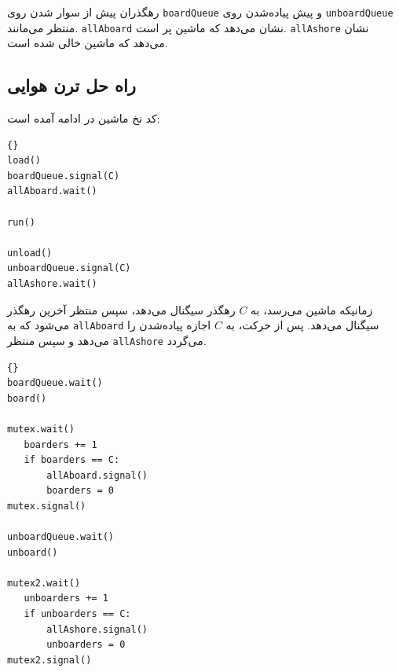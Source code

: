 \documentclass{book}
\newcommand{\clearemptydoublepage}{\newpage\cleardoublepage}
\begin{document}
    رهگذران پیش از سوار شدن  روی {\tt boardQueue}   و پیش پیاده‌شدن روی {\tt unboardQueue} منتظر می‌مانند.   {\tt allAboard}
    نشان می‌دهد که ماشین پر است. {\tt allAshore} نشان می‌دهد که ماشین خالی شده است. 


\clearemptydoublepage
\subsection{راه حل ترن هوایی}

    کد نخ ماشین در ادامه آمده است: 

\begin{latin}
\begin{lstlisting}[title=\rl{راه حل ترن هوایی (ماشین)}]{} 
load()
boardQueue.signal(C)
allAboard.wait()

run()

unload()
unboardQueue.signal(C)
allAshore.wait()
\end{lstlisting}
\end{latin}

    زمانیکه ماشین می‌رسد، به $C$  رهگذر سیگنال می‌دهد، سپس منتظر آخرین رهگذر می‌شود که به {\tt allAboard} سیگنال می‌دهد. 
    پس از حرکت، به $C$ اجازه پیاده‌شدن را می‌دهد و سپس منتظر {\tt allAshore} می‌گردد. 
\begin{latin}
\begin{lstlisting}[title=\rl{راه حل ترن هوایی (رهگذر)}]{} 
boardQueue.wait()
board()

mutex.wait()
   boarders += 1
   if boarders == C:
       allAboard.signal()
       boarders = 0
mutex.signal()

unboardQueue.wait()
unboard()

mutex2.wait()
   unboarders += 1
   if unboarders == C:
       allAshore.signal()
       unboarders = 0
mutex2.signal()
\end{lstlisting}
\end{latin}
\end{document}
